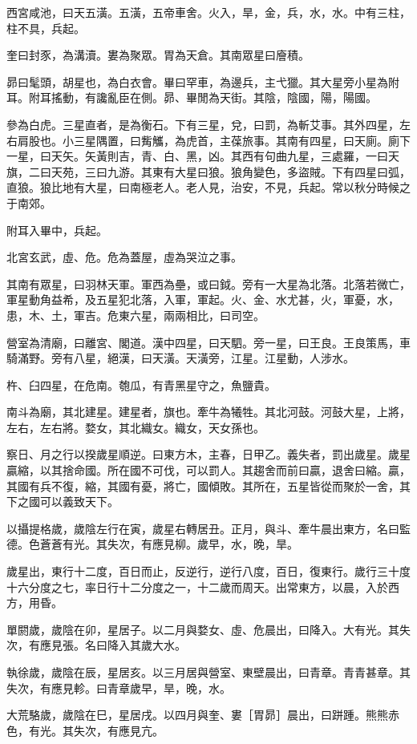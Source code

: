 西宮咸池，曰天五潢。五潢，五帝車舍。火入，旱，金，兵，水，水。中有三柱，柱不具，兵起。

奎曰封豕，為溝瀆。婁為聚眾。胃為天倉。其南眾星曰廥積。

昴曰髦頭，胡星也，為白衣會。畢曰罕車，為邊兵，主弋獵。其大星旁小星為附耳。附耳搖動，有讒亂臣在側。昴、畢閒為天街。其陰，陰國，陽，陽國。

參為白虎。三星直者，是為衡石。下有三星，兌，曰罰，為斬艾事。其外四星，左右肩股也。小三星隅置，曰觜觿，為虎首，主葆旅事。其南有四星，曰天廁。廁下一星，曰天矢。矢黃則吉，青、白、黑，凶。其西有句曲九星，三處羅，一曰天旗，二曰天苑，三曰九游。其東有大星曰狼。狼角變色，多盜賊。下有四星曰弧，直狼。狼比地有大星，曰南極老人。老人見，治安，不見，兵起。常以秋分時候之于南郊。

附耳入畢中，兵起。

北宮玄武，虛、危。危為蓋屋，虛為哭泣之事。

其南有眾星，曰羽林天軍。軍西為壘，或曰鉞。旁有一大星為北落。北落若微亡，軍星動角益希，及五星犯北落，入軍，軍起。火、金、水尤甚，火，軍憂，水，患，木、土，軍吉。危東六星，兩兩相比，曰司空。

營室為清廟，曰離宮、閣道。漢中四星，曰天駟。旁一星，曰王良。王良策馬，車騎滿野。旁有八星，絕漢，曰天潢。天潢旁，江星。江星動，人涉水。

杵、臼四星，在危南。匏瓜，有青黑星守之，魚鹽貴。

南斗為廟，其北建星。建星者，旗也。牽牛為犧牲。其北河鼓。河鼓大星，上將，左右，左右將。婺女，其北織女。織女，天女孫也。

察日、月之行以揆歲星順逆。曰東方木，主春，日甲乙。義失者，罰出歲星。歲星贏縮，以其捨命國。所在國不可伐，可以罰人。其趨舍而前曰贏，退舍曰縮。贏，其國有兵不復，縮，其國有憂，將亡，國傾敗。其所在，五星皆從而聚於一舍，其下之國可以義致天下。

以攝提格歲，歲陰左行在寅，歲星右轉居丑。正月，與斗、牽牛晨出東方，名曰監德。色蒼蒼有光。其失次，有應見柳。歲早，水，晚，旱。

歲星出，東行十二度，百日而止，反逆行，逆行八度，百日，復東行。歲行三十度十六分度之七，率日行十二分度之一，十二歲而周天。出常東方，以晨，入於西方，用昏。

單閼歲，歲陰在卯，星居子。以二月與婺女、虛、危晨出，曰降入。大有光。其失次，有應見張。名曰降入其歲大水。

執徐歲，歲陰在辰，星居亥。以三月居與營室、東壁晨出，曰青章。青青甚章。其失次，有應見軫。曰青章歲早，旱，晚，水。

大荒駱歲，歲陰在巳，星居戌。以四月與奎、婁［胃昴］晨出，曰跰踵。熊熊赤色，有光。其失次，有應見亢。

